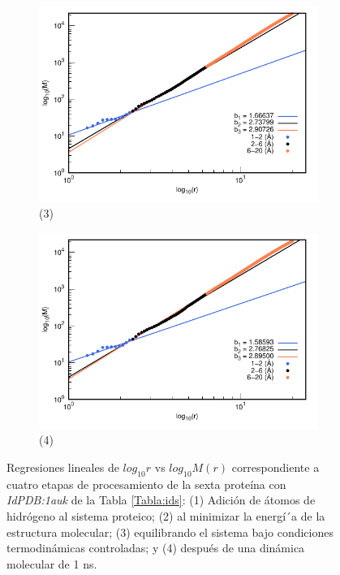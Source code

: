 \begin{figure}[H]
			\vspace{0cm} %
			
			\hspace{-0.3cm} 
			\begin{subfigure}{0.49\textwidth}
				\centering
				\includegraphics[width=\linewidth,page=1]{graphs/PDBs/1auk/1aukEq.pdf}
				\caption{(3)}
			\end{subfigure}
			\hspace{0.2cm}
			\begin{subfigure}{0.49\textwidth} %
				\centering
				\includegraphics[width=\linewidth,page=1]{graphs/PDBs/1auk/1auk1ns.pdf}
				\caption{(4)}
			\end{subfigure}
			\caption{Regresiones lineales de $log_{10}r$ vs $log_{10}M(r)$ correspondiente a cuatro etapas de procesamiento de la sexta prote\'{i}na con \textit{IdPDB:1auk} de la Tabla \ref{Tabla:ids}: (1) Adici\'{o}n de \'{a}tomos de hidr\'{o}geno al sistema proteico; (2) al minimizar la energ\'{i´}a de la estructura molecular; (3) equilibrando el sistema bajo condiciones termodin\'{a}micas controladas; y (4) despu\'{e}s de una din\'{a}mica molecular de 1 ns.}
			\label{fig:1auk}
		\end{figure}
		
